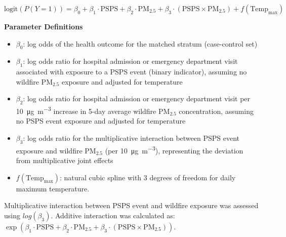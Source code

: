 \documentclass[../main.tex]{subfiles}
\begin{document}
\begin{equation}
\text{logit}(P(Y=1)) = \beta_0 + \beta_1 \cdot \mathrm{PSPS} + \beta_2 \cdot \mathrm{PM_{2.5}} + \beta_3 \cdot (\mathrm{PSPS} \times \mathrm{PM_{2.5}}) + f(\mathrm{Temp_{max}})
\end{equation}

\vspace{1em}

\textbf{Parameter Definitions}

\begin{itemize}
\item $\beta_0$: log odds of the health outcome for the matched stratum (case-control set)
\item $\beta_1$: log odds ratio for hospital admission or emergency department visit associated with exposure to a PSPS event (binary indicator), assuming no wildfire PM$_{2.5}$ exposure and adjusted for temperature
\item $\beta_2$: log odds ratio for hospital admission or emergency department visit per \SI[per-mode=symbol]{10}{\micro\gram\per\cubic\metre} increase in 5-day average wildfire PM$_{2.5}$ concentration, assuming no PSPS event exposure and adjusted for temperature
\item $\beta_3$: log odds ratio for the multiplicative interaction between PSPS event exposure and wildfire PM$_{2.5}$ (per \SI[per-mode=symbol]{10}{\micro\gram\per\cubic\metre}), representing the deviation from multiplicative joint effects
\item $f(\mathrm{Temp_{max}})$: natural cubic spline with 3 degrees of freedom for daily maximum temperature.
\end{itemize}

\vspace{1em}

Multiplicative interaction between PSPS event and wildfire  \PM exposure was assessed using $log(\beta_3)$. Additive interaction was calculated as: $\exp(\beta_1 \cdot \mathrm{PSPS} + \beta_2 \cdot \mathrm{PM}_{2.5} + \beta_3 \cdot (\mathrm{PSPS} \times \mathrm{PM}_{2.5}))$. 

\pagebreak
\end{document}
